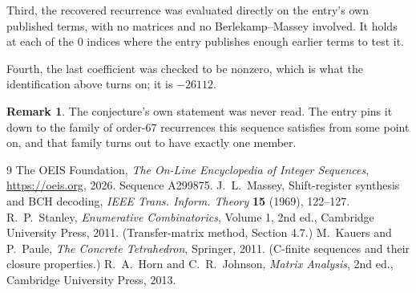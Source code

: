 \documentclass[11pt,a4paper]{article}
\theoremstyle{plain}
\theoremstyle{definition}
\newtheorem{remark}[theorem]{Remark}
\begin{document}
Third, the recovered recurrence was evaluated directly on the entry's own published terms, with
no matrices and no Berlekamp--Massey involved. It holds at each of the $0$ indices where
the entry publishes enough earlier terms to test it.

Fourth, the last coefficient was checked to be nonzero, which is what the identification above
turns on; it is $-26112$.

\begin{remark}
The conjecture's own statement was never read. The entry pins it down to the family of
order-$67$ recurrences this sequence satisfies from some point on, and that family turns
out to have exactly one member.
\end{remark}

\begin{thebibliography}{9}
 The OEIS Foundation, \emph{The On-Line Encyclopedia of Integer
Sequences}, \url{https://oeis.org}, 2026. Sequence A299875.
 J.~L.~Massey, Shift-register synthesis and BCH decoding, \emph{IEEE
Trans. Inform. Theory} \textbf{15} (1969), 122--127.
 R.~P.~Stanley, \emph{Enumerative Combinatorics}, Volume 1, 2nd ed.,
Cambridge University Press, 2011. (Transfer-matrix method, Section 4.7.)
 M.~Kauers and P.~Paule, \emph{The Concrete Tetrahedron}, Springer, 2011.
(C-finite sequences and their closure properties.)
 R.~A.~Horn and C.~R.~Johnson, \emph{Matrix Analysis}, 2nd ed., Cambridge
University Press, 2013.
\end{thebibliography}
\end{document}
